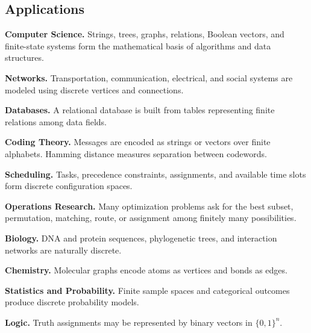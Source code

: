 \subsection{Applications}
\label{subsec:discrete-structures-applications}

\begin{applicationbox}

\textbf{Computer Science.}
Strings, trees, graphs, relations, Boolean vectors, and finite-state
systems form the mathematical basis of algorithms and data structures.

\medskip

\textbf{Networks.}
Transportation, communication, electrical, and social systems are
modeled using discrete vertices and connections.

\medskip

\textbf{Databases.}
A relational database is built from tables representing finite
relations among data fields.

\medskip

\textbf{Coding Theory.}
Messages are encoded as strings or vectors over finite alphabets.
Hamming distance measures separation between codewords.

\medskip

\textbf{Scheduling.}
Tasks, precedence constraints, assignments, and available time slots
form discrete configuration spaces.

\medskip

\textbf{Operations Research.}
Many optimization problems ask for the best subset, permutation,
matching, route, or assignment among finitely many possibilities.

\medskip

\textbf{Biology.}
DNA and protein sequences, phylogenetic trees, and interaction networks
are naturally discrete.

\medskip

\textbf{Chemistry.}
Molecular graphs encode atoms as vertices and bonds as edges.

\medskip

\textbf{Statistics and Probability.}
Finite sample spaces and categorical outcomes produce discrete
probability models.

\medskip

\textbf{Logic.}
Truth assignments may be represented by binary vectors in
\(\{0,1\}^n\).

\end{applicationbox}

